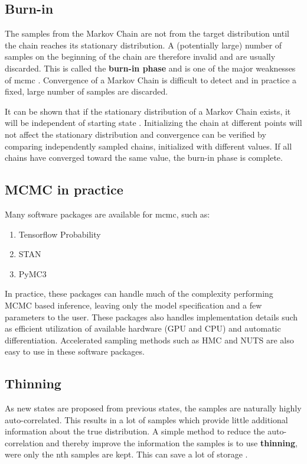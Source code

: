 \subsection{Burn-in}
The samples from the Markov Chain are not from the target distribution until the chain reaches its stationary distribution. A (potentially large) number of samples on the beginning of the chain are therefore invalid and are usually discarded. This is called the \textbf{burn-in phase} and is one of the major weaknesses of \acrshort{mcmc} \cite{murphy}. Convergence of a Markov Chain is difficult to detect and in practice a fixed, large number of samples are discarded.   

It can be shown that if the stationary distribution of a Markov Chain exists, it will be independent of starting state \cite{murphy}. Initializing the chain at different points will not affect the stationary distribution and convergence can be verified by comparing independently sampled chains, initialized with different values. If all chains have converged toward the same value, the burn-in phase is complete.    

\subsection{MCMC in practice}
Many software packages are available for \acrshort{mcmc}, such as: 

\begin{enumerate}
    \item Tensorflow Probability \cite{tensorflow2015-whitepaper}
    \item STAN \cite{stan}
    \item PyMC3 \cite{pymc3}
\end{enumerate}

In practice, these packages can handle much of the complexity performing MCMC based inference, leaving only the model specification and a few parameters to the user. These packages also handles implementation details such as efficient utilization of available hardware (GPU and CPU) and automatic differentiation. Accelerated sampling methods such as HMC and NUTS are also easy to use in these software packages.   

\subsection{Thinning}
As new states are proposed from previous states, the samples are naturally highly auto-correlated. This results in a lot of samples which provide little additional information about the true distribution. A simple method to reduce the auto-correlation and thereby improve the information the samples is to use \textbf{thinning}, were only the nth samples are kept. This can save a lot of storage \cite{murphy}.

